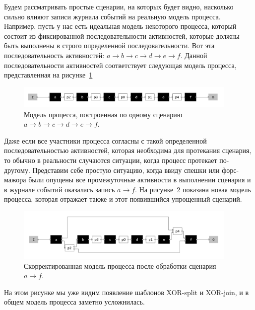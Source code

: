 \documentclass[
11pt,%
tightenlines,%
twoside,%
onecolumn,%
nofloats,%
nobibnotes,%
nofootinbib,%
superscriptaddress,%
noshowpacs,%
centertags]%
{revtex4}
\begin{document}
Будем рассматривать простые сценарии, на которых будет видно, насколько сильно влияют записи журнала событий на реальную модель процесса.
Например, пусть у нас есть идеальная модель некоторого процесса, который состоит из фиксированной последовательности активностей, которые должны быть выполнены в строго определенной последовательности.
Вот эта последовательность активностей: $a \rightarrow b \rightarrow c \rightarrow d \rightarrow e \rightarrow f$.
Данной последовательности активностей соответствует следующая модель процесса, представленная на рисунке~\ref{fig:origin1}

\begin{figure}[h]
\setcaptionmargin{5mm}
\includegraphics[width=0.95\textwidth]{pics/origin1.png}
\caption{Модель процесса, построенная по одному сценарию $a \rightarrow b \rightarrow c \rightarrow d \rightarrow e \rightarrow f$.}
\label{fig:origin1}
\end{figure}

Даже если все участники процесса согласны с такой определенной последовательностью активностей, которая необходима для протекания сценария, то обычно в реальности случаются ситуации, когда процесс протекает по-другому.
Представим себе простую ситуацию, когда ввиду спешки или форс-мажора были опущены все промежуточные активности в выполнении сценария и в журнале событий оказалась запись $a \rightarrow f$.
На рисунке~\ref{fig:second1} показана новая модель процесса, которая отражает также и этот появившийся упрощенный сценарий.

\begin{figure}[h]
\setcaptionmargin{5mm}
\includegraphics[width=0.95\textwidth]{pics/second1.png}
\caption{Скорректированная модель процесса после обработки сценария $a \rightarrow f$.}
\label{fig:second1}
\end{figure}

На этом рисунке мы уже видим появление шаблонов XOR-split и XOR-join, и в общем модель процесса заметно усложнилась.
\end{document}
